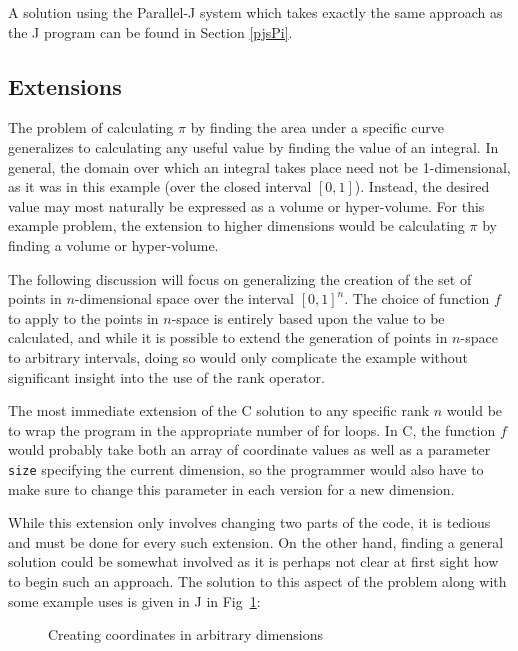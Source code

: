 A solution using the Parallel-J system which takes exactly the same approach as the J program 
can be found in Section \ref{pjsPi}.

\subsection{Extensions}
\label{piext}
The problem of calculating $\pi$ by finding the area under a specific curve 
generalizes to calculating any useful value by finding the value of an integral. 
In general, the domain over which an integral takes place need not be 1-dimensional, 
as it was in this example (over the closed interval $[0,1]$).
Instead, the desired value may most naturally be expressed as a volume or hyper-volume. 
For this example problem, the extension to higher dimensions would be
calculating $\pi$ by finding a volume or hyper-volume.

The following discussion will focus on generalizing the creation of 
the set of points in $n$-dimensional space over the interval $[0,1]^n$.
The choice of function $f$ to apply to the points in $n$-space 
is entirely based upon the value to be calculated, 
and while it is possible to extend the generation of points in $n$-space 
to arbitrary intervals, doing so would only complicate the example 
without significant insight into the use of the rank operator.

The most immediate extension of the C solution to any specific rank $n$ %
would be to wrap the program in the appropriate number of for loops. 
In C, the function $f$ would probably take both 
an array of coordinate values as well as a parameter \texttt{size} specifying the current dimension, 
so the programmer would also have to make sure to change this parameter in each version for a new dimension.

While this extension only involves changing two parts of the code, it is tedious 
and must be done for every such extension. 
On the other hand, finding a general solution could be somewhat involved 
as it is perhaps not clear at first sight how to begin such an approach.
The solution to this aspect of the problem along with some example uses is given in J in Fig~\ref{fig::xs_ext}:


\begin{figure}[h]
\begin{quote}
\begin{singlespacing}
\begin{small}
\end{small}
\end{singlespacing}
\end{quote}
\caption{Creating coordinates in arbitrary dimensions}
\label{fig::xs_ext}
\end{figure}

